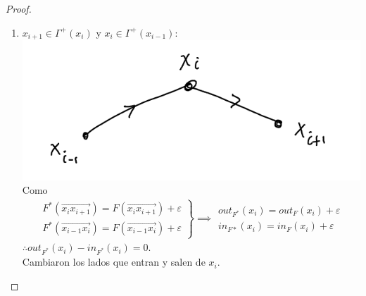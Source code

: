 \begin{proof}
\begin{enumerate}
\item $x_{i+1} \in \Gamma^+(x_i)$ y $x_i\in \Gamma^+(x_{i-1})$:\includegraphics[scale=0.4]{img/forward-forward.png}\\
Como 
\begin{align}
    \left.
    \begin{array}{cc}
    F^*(\overrightarrow{x_i x_{i+1}}) = F(\overrightarrow{x_i x_{i+1}}) + \varepsilon\\
    F^*(\overrightarrow{x_{i-1} x_i}) = F(\overrightarrow{x_{i-1} x_i}) + \varepsilon 
    \end{array}
     \right\} \implies
     \begin{array}{cc}
    out_{F^*}(x_i) = out_F(x_i) + \varepsilon \\
    in_{F*} (x_i) = in_F(x_i) + \varepsilon
    \end{array}
\end{align}
$\therefore out_{F^*} (x_i) - in_{F^*}(x_i) = 0.$\\
Cambiaron los lados que entran y salen de $x_i$.
    

\end{enumerate}
\end{proof}
